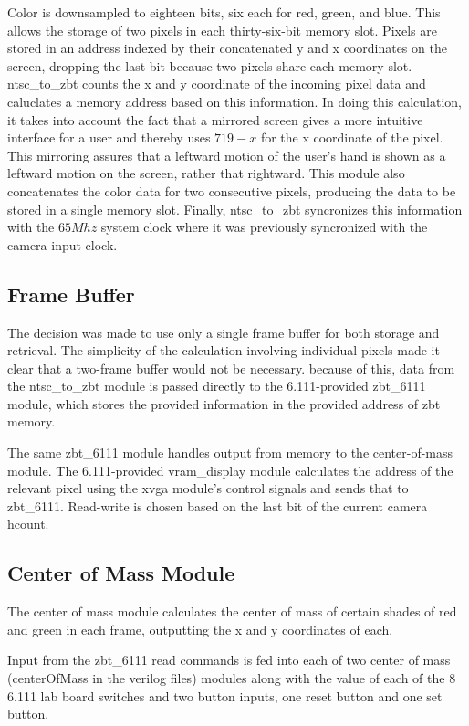 Color is downsampled to eighteen bits, six each for red, green, and blue. This
allows the storage of two pixels in each thirty-six-bit memory slot. Pixels are
stored in an address indexed by their concatenated y and x coordinates on the
screen, dropping the last bit because two pixels share each memory slot.
ntsc\_to\_zbt counts the x and y coordinate of the incoming pixel data and
caluclates a memory address based on this information. In doing this
calculation, it takes into account the fact that a mirrored screen gives a more
intuitive interface for a user and thereby uses $719-x$ for the x coordinate
of the pixel. This mirroring assures that a leftward motion of the user's hand
is shown as a leftward motion on the screen, rather that rightward.  This module
also concatenates the color data for two consecutive pixels, producing the data
to be stored in a single memory slot. Finally, ntsc\_to\_zbt syncronizes this
information with the $65Mhz$ system clock where it was previously syncronized
with the camera input clock.

\subsection{Frame Buffer}

The decision was made to use only a single frame buffer for both storage and
retrieval. The simplicity of the calculation involving individual pixels made it
clear that a two-frame buffer would not be necessary.  because of this, data
from the ntsc\_to\_zbt module is passed directly to the 6.111-provided zbt\_6111
module, which stores the provided information in the provided address of zbt
memory.

The same zbt\_6111 module handles output from memory to the center-of-mass
module. The 6.111-provided vram\_display module calculates
the address of the relevant pixel using the xvga module's control signals and
sends that to zbt\_6111. Read-write is chosen based on the last bit of the
current camera hcount.

\subsection{Center of Mass Module}

The center of mass module calculates the center of mass of certain shades of red
and green in each frame, outputting the x and y coordinates of each.

Input from the zbt\_6111 read commands is fed into each of two center of mass
(centerOfMass in the verilog files) modules along with the value of each of the
8 6.111 lab board switches and two button inputs, one reset button and one set
button.

